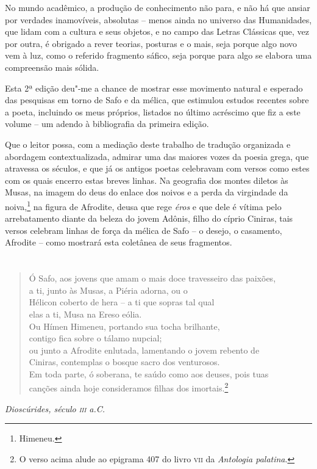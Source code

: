 No mundo acadêmico, a produção de conhecimento não para, e não há que
ansiar por verdades inamovíveis, absolutas -- menos ainda no universo
das Humanidades, que lidam com a cultura e seus objetos,
e no campo das Letras Clássicas que, vez por outra, é obrigado a rever
teorias, posturas e o mais, seja porque algo novo vem à luz, como o 
referido fragmento sáfico, seja porque para algo se elabora uma compreensão mais
sólida.

Esta 2ª edição deu"-me a chance de mostrar esse movimento natural e
esperado das pesquisas em torno de Safo e da mélica, que estimulou
estudos recentes sobre a poeta, incluindo os meus próprios, listados no
último acréscimo que fiz a este volume -- um adendo à bibliografia
da primeira edição.

Que o leitor possa, com a mediação deste trabalho de tradução organizada
e abordagem contextualizada, admirar uma das maiores vozes da poesia grega, que
atravessa os séculos, e que já os antigos poetas celebravam com versos
como estes com os quais encerro estas breves linhas.
Na geografia dos montes diletos às Musas, na imagem do deus do enlace dos noivos 
e a perda da virgindade da noiva,\footnote{Himeneu.} na figura de Afrodite, deusa 
que rege \textit{éros} e que dele é vítima pelo arrebatamento diante 
da beleza do jovem Adônis, filho do cíprio Ciniras, tais versos celebram 
linhas de força da mélica de Safo -- o desejo, o casamento, Afrodite -- como 
mostrará esta coletânea de seus fragmentos.

\pagebreak

\chapter*{}
\thispagestyle{empty}

\vspace*{\fill}
\begin{verse}
\small{Ó Safo, aos jovens que amam o mais doce travesseiro das paixões,\\
a ti, junto às Musas, a Piéria adorna, ou o\\
Hélicon coberto de hera -- a ti que sopras tal qual\\
elas a ti, Musa na Ereso eólia.\\
Ou Hímen Himeneu, portando sua tocha brilhante,\\
contigo fica sobre o tálamo nupcial;\\
ou junto a Afrodite enlutada, lamentando o jovem rebento de\\
Ciniras, contemplas o bosque sacro dos venturosos.\\
Em toda parte, ó soberana, te saúdo como aos deuses, pois tuas\\
canções ainda hoje consideramos filhas dos imortais.}\footnote{O verso acima alude ao epigrama 407 do livro \textsc{vii} da \textit{Antologia palatina}.}
\end{verse}

\begin{flushright}
\small{\textit{Dioscúrides, século \textsc{iii} a.C.}}
\end{flushright}
